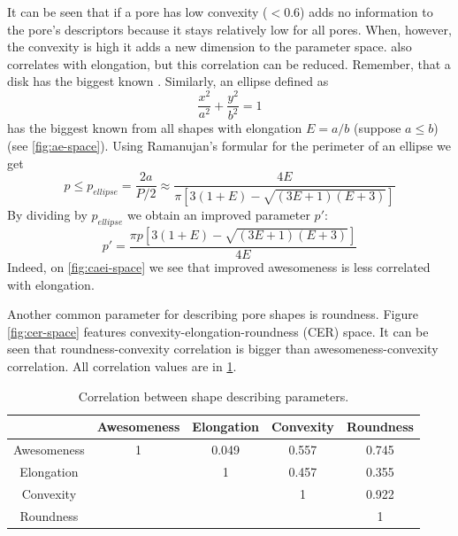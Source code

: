 \documentclass[reprint,amsmath,amssymb,aps,pre,showkeys,showpacs]{revtex4-1}
\newcommand{\highlight}[1]{{\color{red}{#1}}} %
\begin{document}
It can be seen that if a pore has low convexity ($< 0.6$)
\highlight{awesomeness} adds no information to the pore's descriptors because it
stays relatively low for all pores. When, however, the convexity is high it adds
a new dimension to the parameter space. \highlight{Awesomeness} also correlates
with elongation, but this correlation can be reduced. Remember, that a disk has
the biggest known \highlight{awesomeness}. Similarly, an ellipse defined as
\begin{equation*}
  \frac{x^2}{a^2} + \frac{y^2}{b^2} = 1
\end{equation*}
has the biggest known \highlight{awesomeness} from all shapes with elongation
$E = a / b$ (suppose $a \le b$) (see \cref{fig:ae-space}). Using Ramanujan's
formular for the perimeter of an ellipse we get
\begin{equation*}
  p \le p_{ellipse} = \frac{2a}{P/2} \approx \frac{4E}{\pi[3(1+E) - \sqrt{(3E+1)(E+3)}]}
\end{equation*}
By dividing \highlight{awesomeness} by $p_{ellipse}$ we obtain an improved
parameter $p'$:
\begin{equation}
  p' = \frac{\pi p [3(1+E) - \sqrt{(3E+1)(E+3)}]}{4E}
  \label{eq:improved-awesomeness}
\end{equation}
Indeed, on \cref{fig:caei-space} we see that improved awesomeness is less
correlated with elongation.

Another common parameter for describing pore shapes is roundness. Figure
\ref{fig:cer-space} features convexity-elongation-roundness (CER) space.
It can be seen that roundness-convexity correlation is bigger than
awesomeness-convexity correlation. All correlation values are in
\cref{tab:correlations}.
\begin{table}[!htp]
  \centering
  \begin{tabular}{|c|c|c|c|c|}
    \hline
    & Awesomeness & Elongation & Convexity & Roundness \\
    \hline
    Awesomeness & 1 & 0.049 & 0.557 & 0.745 \\
    \hline
    Elongation & & 1 & 0.457 & 0.355 \\
    \hline
    Convexity &&& 1 & 0.922 \\
    \hline
    Roundness &&&& 1 \\
    \hline
  \end{tabular}
  \caption{Correlation between shape describing parameters.}
  \label{tab:correlations}
\end{table}
\end{document}
